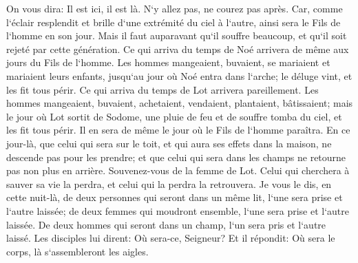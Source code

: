 \verse On vous dira: Il est ici, il est là. N`y allez pas, ne courez pas après. 
\verse Car, comme l`éclair resplendit et brille d`une extrémité du ciel à l`autre, ainsi sera le Fils de l`homme en son jour. 
\verse Mais il faut auparavant qu`il souffre beaucoup, et qu`il soit rejeté par cette génération. 
\verse Ce qui arriva du temps de Noé arrivera de même aux jours du Fils de l`homme. 
\verse Les hommes mangeaient, buvaient, se mariaient et mariaient leurs enfants, jusqu`au jour où Noé entra dans l`arche; le déluge vint, et les fit tous périr. 
\verse Ce qui arriva du temps de Lot arrivera pareillement. Les hommes mangeaient, buvaient, achetaient, vendaient, plantaient, bâtissaient; 
\verse mais le jour où Lot sortit de Sodome, une pluie de feu et de souffre tomba du ciel, et les fit tous périr. 
\verse Il en sera de même le jour où le Fils de l`homme paraîtra. 
\verse En ce jour-là, que celui qui sera sur le toit, et qui aura ses effets dans la maison, ne descende pas pour les prendre; et que celui qui sera dans les champs ne retourne pas non plus en arrière. 
\verse Souvenez-vous de la femme de Lot. 
\verse Celui qui cherchera à sauver sa vie la perdra, et celui qui la perdra la retrouvera. 
\verse Je vous le dis, en cette nuit-là, de deux personnes qui seront dans un même lit, l`une sera prise et l`autre laissée; 
\verse de deux femmes qui moudront ensemble, l`une sera prise et l`autre laissée. 
\verse De deux hommes qui seront dans un champ, l`un sera pris et l`autre laissé. 
\verse Les disciples lui dirent: Où sera-ce, Seigneur? Et il répondit: Où sera le corps, là s`assembleront les aigles. 

